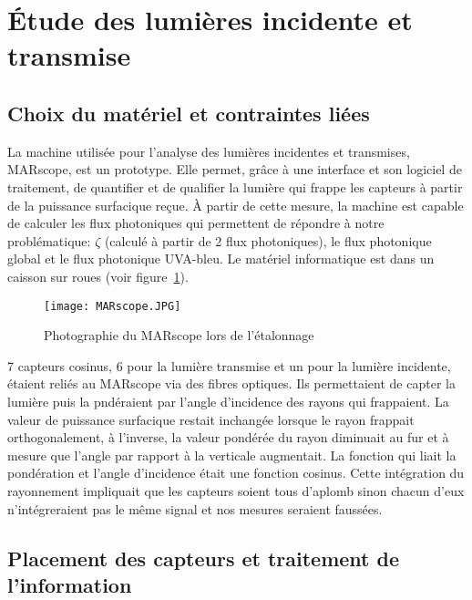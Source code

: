 ﻿\documentclass[12pt]{report}
\begin{document}
\section{Étude des lumières incidente et transmise}

\subsection{Choix du matériel et contraintes liées}


La machine utilisée pour l'analyse des lumières incidentes et transmises, MARscope,
est un prototype. Elle permet, grâce à une interface et son logiciel
de traitement, de quantifier et de qualifier la lumière qui frappe les capteurs
à partir de la puissance surfacique reçue. À partir de cette mesure, la machine est capable de
calculer les flux photoniques qui permettent de répondre à notre problématique:
$\zeta$ (calculé à partir de 2 flux photoniques), le flux photonique
global et le flux photonique UVA-bleu. Le matériel informatique est dans un caisson sur roues
(voir figure~\ref{fig:MARscope}).

\begin{figure}
  \centering
  \texttt{[image: MARscope.JPG]}
  \caption{Photographie du MARscope lors de l'étalonnage\label{fig:MARscope}}
\end{figure}

7 capteurs cosinus, 6 pour la lumière transmise et un pour la lumière incidente,
étaient reliés au MARscope via des fibres optiques. Ils permettaient de capter la
lumière puis la pndéraient par l'angle d'incidence
des rayons qui frappaient. La valeur de puissance surfacique restait inchangée
lorsque le rayon frappait orthogonalement, à l'inverse, la valeur pondérée du rayon
diminuait au fur et à mesure que l'angle par rapport à la verticale augmentait. La
fonction qui liait la pondération et l'angle d'incidence était une fonction
cosinus. Cette intégration du rayonnement
impliquait que les capteurs soient tous d'aplomb sinon chacun d'eux
n'intégreraient pas le même signal et nos mesures seraient faussées.


\subsection{Placement des capteurs et traitement de l'information}

\end{document}
